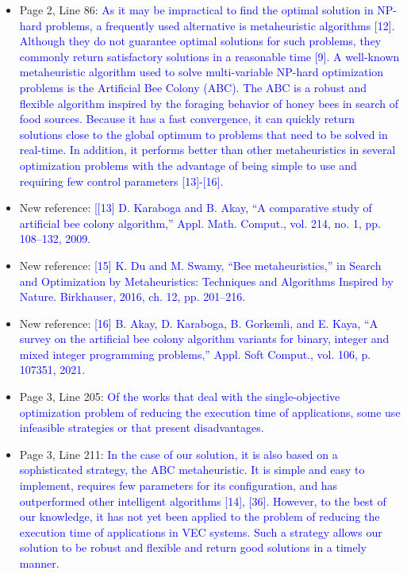 \begin{itemize}
    \item Page 2, Line 86: \textcolor{blue}{As it may be impractical to find the optimal solution in NP-hard problems, a frequently used alternative is metaheuristic algorithms [12]. Although they do not guarantee optimal solutions for such problems, they commonly return satisfactory solutions in a reasonable time [9]. A well-known metaheuristic algorithm used to solve multi-variable NP-hard optimization problems is the Artificial Bee Colony (ABC). The ABC is a robust and flexible algorithm inspired by the foraging behavior of honey bees in search of food sources. Because it has a fast convergence, it can quickly return solutions close to the global optimum to problems that need to be solved in real-time. In addition, it performs better than other metaheuristics in several optimization problems with the advantage of being simple to use and requiring few control parameters [13]-[16].}
     \item New reference: \textcolor{blue}{[[13] D. Karaboga and B. Akay, “A comparative study of artificial bee colony algorithm,” Appl. Math. Comput., vol. 214, no. 1, pp. 108–132, 2009.}
    \item New reference: \textcolor{blue}{[15] K. Du and M. Swamy, “Bee metaheuristics,” in Search and Optimization by Metaheuristics: Techniques and Algorithms Inspired by Nature. Birkhauser, 2016, ch. 12, pp. 201–216.}
    \item New reference: \textcolor{blue}{[16] B. Akay, D. Karaboga, B. Gorkemli, and E. Kaya, “A survey on the artificial bee colony algorithm variants for binary, integer and mixed integer programming problems,” Appl. Soft Comput., vol. 106, p. 107351, 2021.}
    \item Page 3, Line 205: \textcolor{blue}{Of the works that deal with the single-objective optimization problem of reducing the execution time of applications, some use infeasible strategies or that present disadvantages.}
    \item Page 3, Line 211: \textcolor{blue}{In the case of our solution, it is also based on a sophisticated strategy, the ABC metaheuristic. It is simple and easy to implement, requires few parameters for its configuration, and has outperformed other intelligent algorithms [14], [36]. However, to the best of our knowledge, it has not yet been applied to the problem of reducing the execution time of applications in VEC systems. Such a strategy allows our solution to be robust and flexible and return good solutions in a timely manner.}    
\end{itemize}

